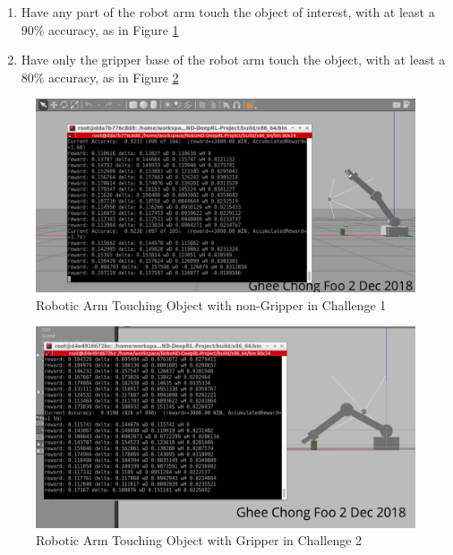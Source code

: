 \documentclass[10pt,journal,compsoc]{IEEEtran}
\begin{document}
\begin{enumerate}
    \item Have any part of the robot arm touch the object of interest, with at least a 90\% accuracy, as in Figure \ref{fig:Challenge_1}

    \item Have only the gripper base of the robot arm touch the object, with at least a 80\% accuracy, as in Figure \ref{fig:Challenge_2}
\end{enumerate}

\begin{figure}[thpb]
      \centering
      \includegraphics[width=\linewidth]{Challenge_1.png}
      \caption{Robotic Arm Touching Object with non-Gripper in Challenge 1}
      \label{fig:Challenge_1}
\end{figure}

\begin{figure}[thpb]
      \centering
      \includegraphics[width=\linewidth]{Challenge_2.png}
      \caption{Robotic Arm Touching Object with Gripper in Challenge 2}
      \label{fig:Challenge_2}
\end{figure}

\end{document}
